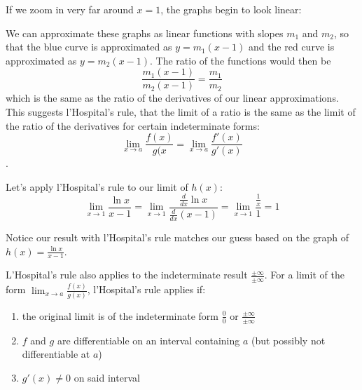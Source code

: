 
If we zoom in very far around $x=1$, the graphs begin to look linear:


We can approximate these graphs as linear functions with slopes $m_1$ and $m_2$, so that the blue curve is approximated as $y=m_1(x-1)$ and the red curve is approximated as $y=m_2(x-1)$. The ratio of the functions would then be $$\frac{m_1(x-1)}{m_2(x-1)}=\frac{m_1}{m_2}$$ which is the same as the ratio of the derivatives of our linear approximations. This suggests l'Hospital's rule, that the limit of a ratio is the same as the limit of the ratio of the derivatives for certain indeterminate forms: $$\lim_{x\to a}\frac{f(x)}{g(x}=\lim_{x\to a}\frac{f'(x)}{g'(x)}$$.

Let's apply l'Hospital's rule to our limit of $h(x)$:
$$\lim_{x\to 1}\frac{\ln{x}}{x-1}=\lim_{x \to 1}\frac{\frac{d}{dx}\ln{x}}{\frac{d}{dx}(x-1)}=\lim_{x \to 1}\frac{\frac{1}{x}}{1}=1$$

Notice our result with l'Hospital's rule matches our guess based on the graph of $h(x) = \frac{\ln{x}}{x-1}$. 

L'Hospital's rule also applies to the indeterminate result $\frac{\pm \infty}{\pm \infty}$. For a limit of the form $\lim_{x\to a}\frac{f(x)}{g(x)}$, l'Hospital's rule applies if:
\begin{enumerate}
    \item the original limit is of the indeterminate form $\frac{0}{0}$ or $\frac{\pm \infty}{\pm \infty}$
    \item $f$ and $g$ are differentiable on an interval containing $a$ (but possibly not differentiable at $a$)
    \item $g'(x) \neq 0$ on said interval
\end{enumerate}

